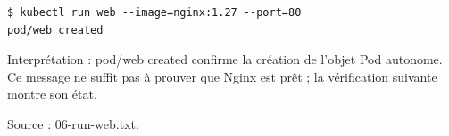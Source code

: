 \documentclass[11pt,a4paper]{article}
\begin{document}
\par\medskip\noindent\begin{minipage}{\linewidth}
\par\vspace{4pt}\noindent\begin{minipage}{\linewidth}
\begin{Verbatim}[breaklines=true,breakanywhere=true,fontsize=\footnotesize,frame=single,framesep=8pt,rulecolor=\color{teal}]
$ kubectl run web --image=nginx:1.27 --port=80
pod/web created
\end{Verbatim}
\end{minipage}\par\vspace{6pt}

Interprétation : pod/web created confirme la création de l'objet Pod autonome. Ce message ne suffit pas à prouver que Nginx est prêt ; la vérification suivante montre son état.

{\footnotesize\color{teal} Source : 06-run-web.txt.\par}
\end{minipage}\par\medskip
\end{document}
